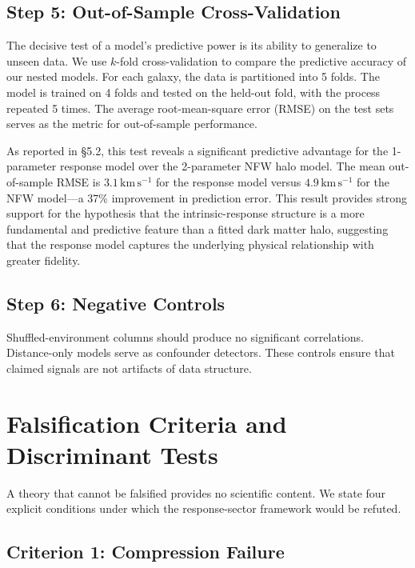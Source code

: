 \documentclass[11pt]{article}
\begin{document}
\subsection{Step 5: Out-of-Sample Cross-Validation}\label{step-5-out-of-sample-cross-validation}

The decisive test of a model's predictive power is its ability to generalize to unseen data. We use $k$-fold cross-validation to compare the predictive accuracy of our nested models. For each galaxy, the data is partitioned into 5 folds. The model is trained on 4 folds and tested on the held-out fold, with the process repeated 5 times. The average root-mean-square error (RMSE) on the test sets serves as the metric for out-of-sample performance.

As reported in \S5.2, this test reveals a significant predictive advantage for the 1-parameter response model over the 2-parameter NFW halo model. The mean out-of-sample RMSE is $3.1\,\text{km}\,\text{s}^{-1}$ for the response model versus $4.9\,\text{km}\,\text{s}^{-1}$ for the NFW model---a 37\% improvement in prediction error. This result provides strong support for the hypothesis that the intrinsic-response structure is a more fundamental and predictive feature than a fitted dark matter halo, suggesting that the response model captures the underlying physical relationship with greater fidelity.

\subsection{Step 6: Negative Controls}\label{step-6-negative-controls}

Shuffled-environment columns should produce no significant correlations. Distance-only models serve as confounder detectors. These controls ensure that claimed signals are not artifacts of data structure.

\section{Falsification Criteria and Discriminant Tests}\label{falsification-criteria-and-discriminant-tests}

A theory that cannot be falsified provides no scientific content. We state four explicit conditions under which the response-sector framework would be refuted.

\subsection{Criterion 1: Compression Failure}\label{criterion-1-compression-failure}
\end{document}
